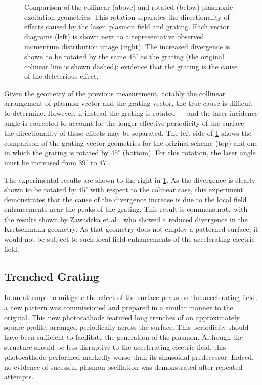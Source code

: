 \begin{figure}
  \centering
  
  \caption[Comparison of the colinear and rotated plasmonic excitation geometries]{
    Comparison of the collinear (above) and rotated (below) plasmonic excitation geometries.
    This rotation separates the directionality of effects caused by the laser, plasmon field and grating.
    Each vector diagrams (left) is shown next to a representative observed momentum distribution image (right).
    The increased divergence is shown to be rotated by the same $45^{\circ}$ as the grating (the original colinear line is shown dashed); evidence that the grating is the cause of the deleterious effect.
  }
  \label{fig:rotated}
\end{figure}

Given the geometry of the previous measurement, notably the collinear arrangement of plasmon vector and the grating vector, the true cause is difficult to determine.
However, if instead the grating is rotated --- and the laser incidence angle is corrected to account for the longer effective periodicity of the surface --- the directionality of these effects may be separated.
The left side of \ref{fig:rotated} shows the comparison of the grating vector geometries for the original scheme (top) and one in which the grating is rotated by $45^{\circ}$ (bottom).
For this rotation, the laser angle must be increased from $39^{\circ}$ to $47^{\circ}$.

The experimental results are shown to the right in \ref{fig:rotated}.
As the divergence is clearly shown to be rotated by $45^{\circ}$ with respect to the colinear case, this experiment demonstrates that the cause of the divergence increase is due to the local field enhancements near the peaks of the grating.
This result is commensurate with the results shown by Zawadzka et al \cite{zawadzka_evanescent_2001}, who showed a reduced divergence in the Kretschmann geometry.
As that geometry does not employ a patterned surface, it would not be subject to such local field enhancements of the accelerating electric field.

\subsection{Trenched Grating}

In an attempt to mitigate the effect of the surface peaks on the accelerating field, a new pattern was commissioned and prepared in a similar manner to the original.
This new photocathode featured long trenches of an approximately square profile, arranged periodically across the surface.
This periodicity should have been sufficient to facilitate the generation of the plasmon.
Although the structure should be less disruptive to the accelerating electric field, this photocathode performed markedly worse than its sinusoidal predecessor.
Indeed, no evidence of sucessful plasmon oscillation was demonstrated after repeated attempts.

